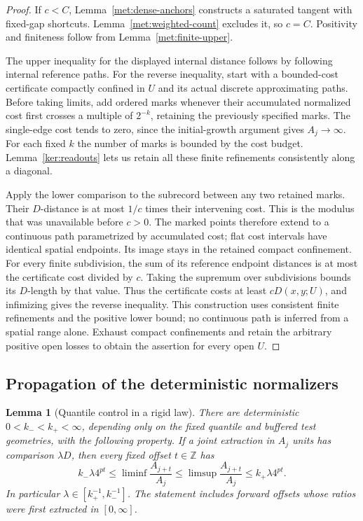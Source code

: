 \documentclass[11pt]{article}
\numberwithin{equation}{section}
\newtheorem{lemma}[theorem]{Lemma}
\theoremstyle{definition}
\theoremstyle{remark}
\newcommand{\1}{\mathbf 1}
\begin{document}
\begin{proof}
If $c<C$, Lemma~\ref{met:dense-anchors} constructs a saturated
tangent with fixed-gap shortcuts.  Lemma~\ref{met:weighted-count}
excludes it, so $c=C$.  Positivity and finiteness follow from
Lemma~\ref{met:finite-upper}.

The upper inequality for the displayed internal distance follows
by following internal reference paths.  For the reverse inequality,
start with a bounded-cost certificate compactly confined in $U$ and
its actual discrete approximating paths.  Before taking limits, add
ordered marks whenever their accumulated normalized cost first crosses
a multiple of $2^{-k}$, retaining the previously specified marks.
The single-edge cost tends to zero, since the initial-growth argument
gives $A_j\to\infty$.  For each fixed $k$ the number of marks is
bounded by the cost budget.  Lemma~\ref{ker:readouts} lets us retain
all these finite refinements consistently along a diagonal.

Apply the lower comparison to the subrecord between any two retained
marks.  Their $D$-distance is at most $1/c$ times their intervening
cost.  This is the modulus that was unavailable before $c>0$.
The marked points therefore extend to a continuous path parametrized
by accumulated cost; flat cost intervals have identical spatial
endpoints.  Its image stays in the retained compact confinement.
For every finite subdivision, the sum of its reference endpoint
distances is at most the certificate cost divided by $c$.  Taking
the supremum over subdivisions bounds its $D$-length by that value.
Thus the certificate costs at least $cD(x,y;U)$, and infimizing gives
the reverse inequality.  This construction uses consistent finite
refinements and the positive lower bound; no continuous path is
inferred from a spatial range alone.  Exhaust compact confinements and retain
the arbitrary positive open losses to obtain the assertion for
every open $U$.
\end{proof}

\subsection{Propagation of the deterministic normalizers}

\begin{lemma}[Quantile control in a rigid law]
\label{met:rigid-quantiles}
There are deterministic $0<k_-<k_+<\infty$, depending only on the
fixed quantile and buffered test geometries, with the following
property.  If a joint extraction in $A_j$ units has comparison
$\lambda D$, then every fixed offset $t\in\mathbb Z$ has
\begin{equation}
 k_-\lambda4^{pt}
 \leq \liminf\frac{A_{j+t}}{A_j}
 \leq \limsup\frac{A_{j+t}}{A_j}
 \leq k_+\lambda4^{pt}.
 \label{met:rigid-ratios}
\end{equation}
In particular $\lambda\in[k_+^{-1},k_-^{-1}]$.  The statement
includes forward offsets whose ratios were first extracted in
$[0,\infty]$.
\end{lemma}
\end{document}
